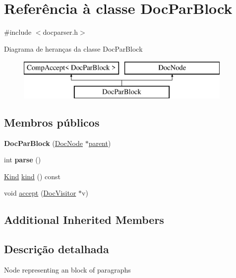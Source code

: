 \hypertarget{class_doc_par_block}{\section{Referência à classe Doc\-Par\-Block}
\label{class_doc_par_block}
}


{\ttfamily \#include $<$docparser.\-h$>$}

Diagrama de heranças da classe Doc\-Par\-Block\begin{figure}[H]
\begin{center}
\leavevmode
\includegraphics[height=2.000000cm]{class_doc_par_block}
\end{center}
\end{figure}
\subsection*{Membros públicos}
\begin{DoxyCompactItemize}
\item 
\hypertarget{class_doc_par_block_a50a9a036b539e0e66232a589ee02a459}{{\bfseries Doc\-Par\-Block} (\hyperlink{class_doc_node}{Doc\-Node} $\ast$\hyperlink{class_doc_node_abd7f070d6b0a38b4da71c2806578d19d}{parent})}\label{class_doc_par_block_a50a9a036b539e0e66232a589ee02a459}

\item 
\hypertarget{class_doc_par_block_a67007fc2be130666fbf3b065022756f4}{int {\bfseries parse} ()}\label{class_doc_par_block_a67007fc2be130666fbf3b065022756f4}

\item 
\hyperlink{class_doc_node_aa10c9e8951b8ccf714a59ec321bdac5b}{Kind} \hyperlink{class_doc_par_block_aa9d037bed9f9a083d0cd01485637d843}{kind} () const 
\item 
void \hyperlink{class_doc_par_block_a7ba716e854ae2f8f87a4eb2140e302b6}{accept} (\hyperlink{class_doc_visitor}{Doc\-Visitor} $\ast$v)
\end{DoxyCompactItemize}
\subsection*{Additional Inherited Members}


\subsection{Descrição detalhada}
Node representing an block of paragraphs 

